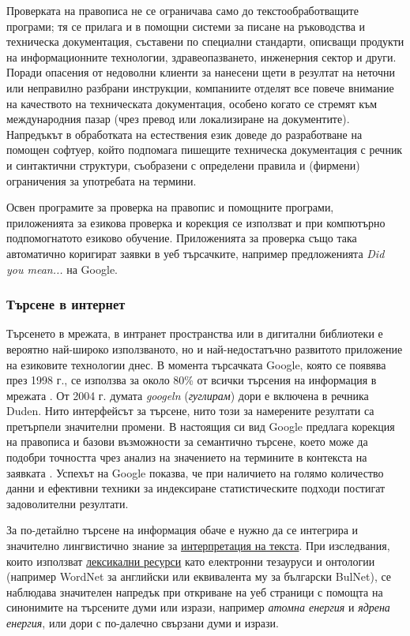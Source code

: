 \begin{multicols}{2}
Проверката на правописа не се ограничава само до текстообработващите програми; тя се прилага и в помощни системи за писане на ръководства и техническа документация, съставени по специални стандарти, описващи продукти на информационните технологии, здравеопазването, инженерния сектор и други. 
Поради опасения от недоволни клиенти за нанесени щети в резултат на неточни или неправилно разбрани инструкции, компаниите отделят все повече внимание на качеството на техническата документация, особено когато се стремят към международния пазар (чрез превод или локализиране на документите).
Напредъкът в обработката на естествения език доведе до разработване на помощен софтуер, който подпомага пишещите техническа документация с речник и синтактични структури, съобразени с определени правила и (фирмени) ограничения за употребата на термини. 

Освен програмите за проверка на правопис и помощните програми, приложенията за езикова проверка и корекция се използват и при компютърно подпомогнатото езиково обучение. Приложенията за проверка също така автоматично коригират заявки в уеб търсачките, например предложенията \textit{Did you mean...} на Google. 

\subsubsection{Търсене в интернет}

Търсенето в мрежата, в интранет пространства или в дигитални библиотеки е вероятно най-широко използваното, но и най-недостатъчно развитото приложение на езиковите технологии днес. 
В момента търсачката Google, която се
 появява през 1998 г., се използва за около 80\% от всички търсения на информация в мрежата \cite{spi1}. От 2004 г. думата {\it googeln} ({\it гуглирам}) дори е включена в речника Duden. Нито интерфейсът за търсене, нито този за
 намерените резултати са претърпели значителни
 промени. В настоящия си
 вид Google предлага корекция на правописа и
базови възможности за семантично търсене, което може да подобри
 точността чрез анализ на значението на
 термините в контекста на заявката  \cite{pc1}. Успехът на Google
 показва, че при наличието на голямо количество данни и ефективни
 техники за индексиране статистическите
 подходи постигат задоволителни резултати.

За по-детайлно търсене на информация обаче е нужно да
 се интегрира и значително лингвистично знание за \uline{интерпретация на текста}. 
При изследвания, които използват \uline{лексикални ресурси} като електронни тезауруси и онтологии (например WordNet за английски или еквивалента му за български BulNet), се наблюдава значителен напредък при откриване на уеб
 страници с помощта на синонимите на търсените думи или изрази, например {\it атомна енергия} и {\it ядрена енергия}, или дори с по-далечно свързани думи и изрази.


\end{multicols}

